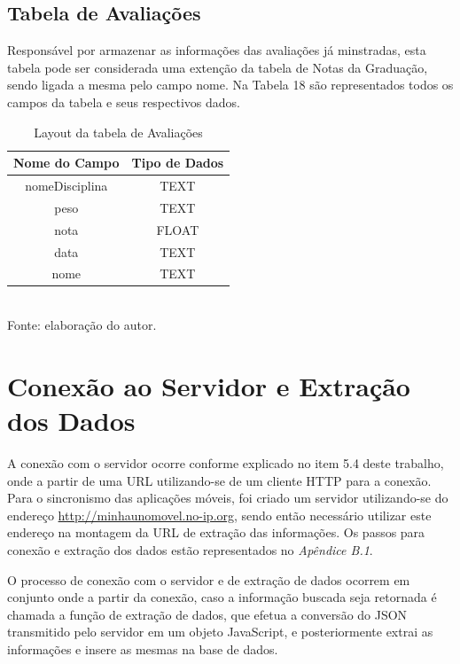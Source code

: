 \subsection{Tabela de Avaliações}
Responsável por armazenar as informações das avaliações já minstradas, esta tabela pode ser considerada uma extenção da tabela de Notas da Graduação, sendo ligada a mesma pelo campo nome. Na Tabela 18 são representados todos os campos da tabela e seus respectivos dados.
    
\begin{table}[!hbt]
\centering
\caption[Aplicação - Tabela de Avaliações]{Layout da tabela de Avaliações}
\vspace{3mm}
\begin{tabular}{c|c}\hline
\textbf{Nome do Campo} & \textbf{Tipo de Dados} \\ \hline
nomeDisciplina         & TEXT                   \\ \hline
peso                   & TEXT                   \\ \hline
nota                   & FLOAT                  \\ \hline
data                   & TEXT                   \\ \hline 
nome                   & TEXT                   \\ \hline
\end{tabular}
\\ Fonte: elaboração do autor.
\end{table}

\section{Conexão ao Servidor e Extração dos Dados}
A conexão com o servidor ocorre conforme explicado no item 5.4 deste trabalho, onde a partir de uma URL utilizando-se de um cliente HTTP para a conexão. Para o sincronismo das aplicações móveis, foi criado um servidor utilizando-se do endereço \url{http://minhaunomovel.no-ip.org}, sendo então necessário utilizar este endereço na montagem da URL de extração das informações. Os passos para conexão e extração dos dados estão representados no \emph{Apêndice B.1}.

O processo de conexão com o servidor e de extração de dados ocorrem em conjunto onde a partir da conexão, caso a informação buscada seja retornada é chamada a função de extração de dados, que efetua a conversão do JSON transmitido pelo servidor em um objeto JavaScript, e posteriormente extrai as informações e insere as mesmas na base de dados. 

